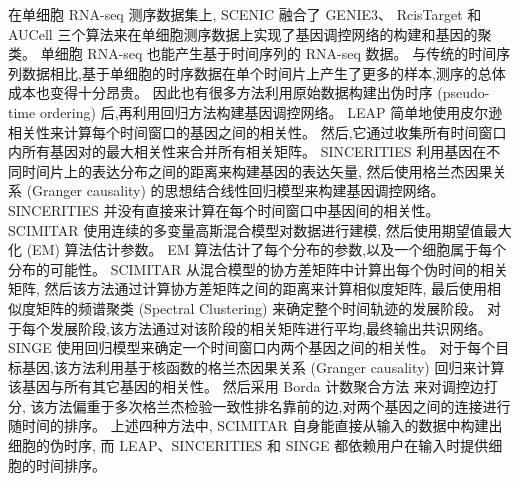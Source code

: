 在单细胞 RNA-seq 测序数据集上, 
SCENIC  融合了 GENIE3、 RcisTarget 和 AUCell 三个算法来在单细胞测序数据上实现了基因调控网络的构建和基因的聚类。
单细胞 RNA-seq 也能产生基于时间序列的 RNA-seq 数据。
与传统的时间序列数据相比,基于单细胞的时序数据在单个时间片上产生了更多的样本,测序的总体成本也变得十分昂贵。
因此也有很多方法利用原始数据构建出伪时序 (pseudo-time ordering) 后,再利用回归方法构建基因调控网络。
LEAP  简单地使用皮尔逊相关性来计算每个时间窗口的基因之间的相关性。 
然后,它通过收集所有时间窗口内所有基因对的最大相关性来合并所有相关矩阵。
SINCERITIES  利用基因在不同时间片上的表达分布之间的距离来构建基因的表达矢量,
然后使用格兰杰因果关系 (Granger causality) 的思想结合线性回归模型来构建基因调控网络。
SINCERITIES 并没有直接来计算在每个时间窗口中基因间的相关性。
SCIMITAR  使用连续的多变量高斯混合模型对数据进行建模,
然后使用期望值最大化 (EM) 算法估计参数。
EM 算法估计了每个分布的参数,以及一个细胞属于每个分布的可能性。
SCIMITAR 从混合模型的协方差矩阵中计算出每个伪时间的相关矩阵,
然后该方法通过计算协方差矩阵之间的距离来计算相似度矩阵,
最后使用相似度矩阵的频谱聚类 (Spectral Clustering) 来确定整个时间轨迹的发展阶段。
对于每个发展阶段,该方法通过对该阶段的相关矩阵进行平均,最终输出共识网络。
SINGE  使用回归模型来确定一个时间窗口内两个基因之间的相关性。
对于每个目标基因,该方法利用基于核函数的格兰杰因果关系 (Granger causality) 回归来计算该基因与所有其它基因的相关性。
然后采用 Borda 计数聚合方法  来对调控边打分,
该方法偏重于多次格兰杰检验一致性排名靠前的边,对两个基因之间的连接进行随时间的排序。
上述四种方法中, SCIMITAR 自身能直接从输入的数据中构建出细胞的伪时序, 
而 LEAP、SINCERITIES 和 SINGE 都依赖用户在输入时提供细胞的时间排序。

